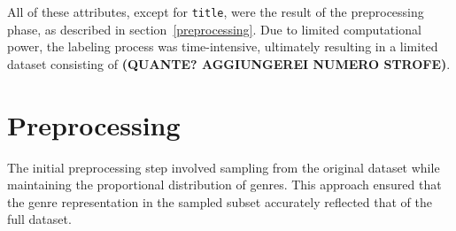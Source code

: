 All of these attributes, except for \texttt{title}, were the result
of the preprocessing phase, as described in section~\ref{preprocessing}.
Due to limited computational power, the labeling process was time-intensive,
ultimately resulting in a limited dataset consisting of
\textbf{(QUANTE? AGGIUNGEREI NUMERO STROFE)}.


\section*{Preprocessing}
\label{preprocessing}
The initial preprocessing step involved sampling from the original dataset
while maintaining the proportional distribution of genres.
This approach ensured that the genre representation in the sampled subset
accurately reflected that of the full dataset.\\


